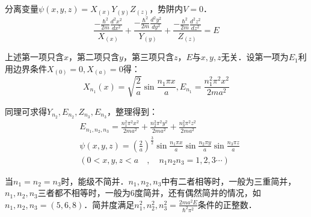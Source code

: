 分离变量$\psi(x,y,z) = X_(x)Y_(y)Z_(z) $，势阱内$V=0$．\\
\begin{equation}
\frac{-\frac{\hbar^{2}}{2m}\frac{d^{2} {x}^{2}}{d{x^{2}}}}{X_(x)} + \frac{-\frac{\hbar^{2}}{2m}\frac{d^{2} {y}^{2}}{d{y^{2}}}}{Y_(y)} + \frac{-\frac{\hbar^{2}}{2m}\frac{d^{2} {z}^{2}}{d{z^{2}}}}{Z_(z)} = E
\end{equation}

上述第一项只含$x$，第二项只含$y$，第三项只含$z$，$E$与$x,y,z$无关．设第一项为$E_1$利用边界条件$X_{(0)} = 0,X_{(a)} = 0$得：\\
\begin{equation}
X_{n_1}(x) = \sqrt{\frac{2}{a}} \sin{\frac{n_{1} \pi x}{a}},E_{n_1} = \frac{n^2_1 \pi^2 x^2}{2ma^2}
\end{equation}

同理可求得$Y_{n_2},E_{n_2},Z_{n_3},E_{n_3} $，整理得到：\\
\begin{equation}
\begin{aligned}
& E_{n_1,n_2,n_3} =\frac{n^2_1 \pi^2 x^2}{2ma^2}+\frac{n^2_2 \pi^2 y^2}{2ma^2}+\frac{n^2_3 \pi^2 z^2}{2ma^2} \\
& \psi(x,y,z) = (\frac{2}{a})^{\frac{3}{2}} \sin{\frac{n_1 \pi x}{a}} \sin{\frac{n_2 \pi y}{a}} \sin{\frac{n_3 \pi z}{a}} \\
& (0<x,y,z<a \quad , \quad n_1 n_2 n_3 = 1,2,3 \cdots)
\end{aligned}
\end{equation}

当$n_1 = n_2 = n_3$时，能级不简并．$n_1 , n_2 , n_3 $中有二者相等时，一般为三重简并，$n_1 , n_2 , n_3 $三者都不相等时，一般为6度简并，还有偶然简并的情况，如$n_1 , n_2 , n_3 =(5,6,8) $．简并度满足$\displaystyle n^2_1 , n^2_2 , n^2_3 = \frac{2ma^2 E}{\hbar^2 \pi^2}$条件的正整数．

